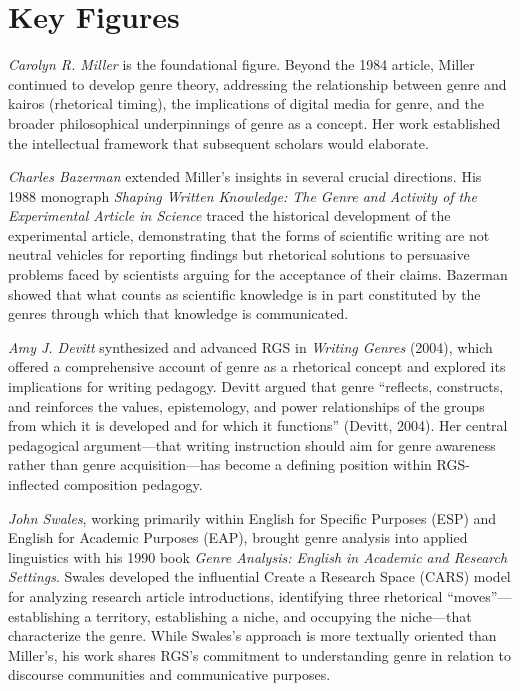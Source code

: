 \documentclass[12pt]{article}
\begin{document}
\section{Key Figures}

\textit{Carolyn R. Miller} is the foundational figure. Beyond the 1984 article, Miller continued to develop genre theory, addressing the relationship between genre and kairos (rhetorical timing), the implications of digital media for genre, and the broader philosophical underpinnings of genre as a concept. Her work established the intellectual framework that subsequent scholars would elaborate.

\textit{Charles Bazerman} extended Miller's insights in several crucial directions. His 1988 monograph \textit{Shaping Written Knowledge: The Genre and Activity of the Experimental Article in Science} traced the historical development of the experimental article, demonstrating that the forms of scientific writing are not neutral vehicles for reporting findings but rhetorical solutions to persuasive problems faced by scientists arguing for the acceptance of their claims. Bazerman showed that what counts as scientific knowledge is in part constituted by the genres through which that knowledge is communicated.

\textit{Amy J. Devitt} synthesized and advanced RGS in \textit{Writing Genres} (2004), which offered a comprehensive account of genre as a rhetorical concept and explored its implications for writing pedagogy. Devitt argued that genre ``reflects, constructs, and reinforces the values, epistemology, and power relationships of the groups from which it is developed and for which it functions'' (Devitt, 2004). Her central pedagogical argument---that writing instruction should aim for genre awareness rather than genre acquisition---has become a defining position within RGS-inflected composition pedagogy.

\textit{John Swales}, working primarily within English for Specific Purposes (ESP) and English for Academic Purposes (EAP), brought genre analysis into applied linguistics with his 1990 book \textit{Genre Analysis: English in Academic and Research Settings}. Swales developed the influential Create a Research Space (CARS) model for analyzing research article introductions, identifying three rhetorical ``moves''---establishing a territory, establishing a niche, and occupying the niche---that characterize the genre. While Swales's approach is more textually oriented than Miller's, his work shares RGS's commitment to understanding genre in relation to discourse communities and communicative purposes.
\end{document}
